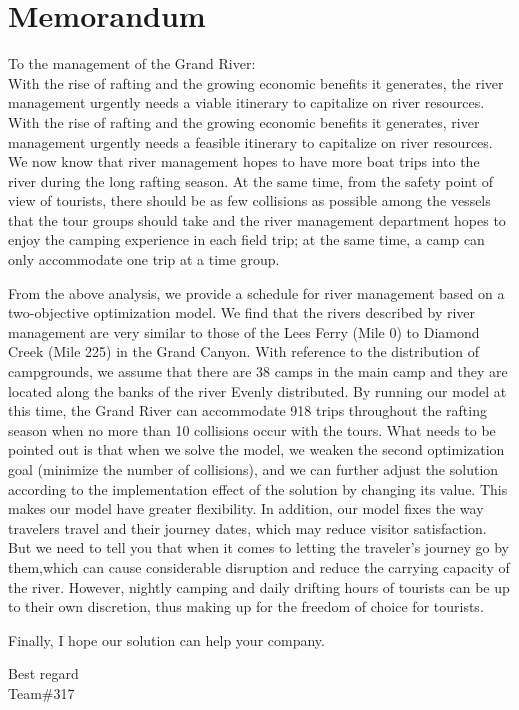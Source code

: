 \newpage
\section{Memorandum}
\noindent
To the management of the Grand River:\\
\newline
\noindent
With the rise of rafting and the growing economic benefits it generates, the river management urgently needs a viable itinerary to capitalize on river resources. With the rise of rafting and the growing economic benefits it generates, river management urgently needs a feasible itinerary to capitalize on river resources. We now know that river management hopes to have more boat trips into the river during the long rafting season. At the same time, from the safety point of view of tourists, there should be as few collisions as possible among the vessels that the tour groups should take and the river management department hopes to enjoy the camping experience in each field trip; at the same time, a camp can only accommodate one trip at a time group.
\par From the above analysis, we provide a schedule for river management based on a two-objective optimization model. We find that the rivers described by river management are very similar to those of the Lees Ferry (Mile 0) to Diamond Creek (Mile 225) in the Grand Canyon. With reference to the distribution of campgrounds, we assume that there are 38 camps in the main camp and they are located along the banks of the river Evenly distributed. By running our model at this time, the Grand River can accommodate 918 trips throughout the rafting season when no more than 10 collisions occur with the tours. What needs to be pointed out is that when we solve the model, we weaken the second optimization goal (minimize the number of collisions), and we can further adjust the solution according to the implementation effect of the solution by changing its value. This makes our model have greater flexibility. In addition, our model fixes the way travelers travel and their journey dates, which may reduce visitor satisfaction. But we need to tell you that when it comes to letting the traveler's journey go by them,which can cause considerable disruption and reduce the carrying capacity of the river. However, nightly camping and daily drifting hours of tourists can be up to their own discretion, thus making up for the freedom of choice for tourists.
\par Finally, I hope our solution can help your company.
\begin{flushright}
 	Best regard\\
	Team\#317
\end{flushright}